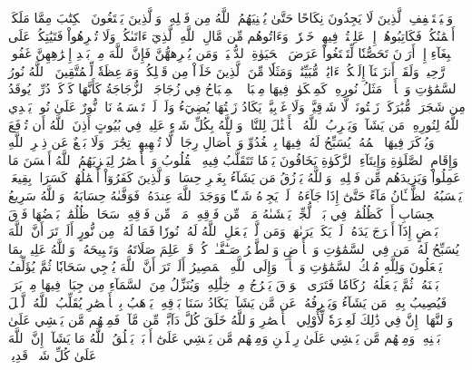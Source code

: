 وَلۡيَسۡتَعۡفِفِ ٱلَّذِينَ لَا يَجِدُونَ نِكَاحًا حَتَّىٰ يُغۡنِيَهُمُ ٱللَّهُ مِن فَضۡلِهِۦۗ وَٱلَّذِينَ يَبۡتَغُونَ ٱلۡكِتَٰبَ مِمَّا مَلَكَتۡ أَيۡمَٰنُكُمۡ فَكَاتِبُوهُمۡ إِنۡ عَلِمۡتُمۡ فِيهِمۡ خَيۡرٗاۖ وَءَاتُوهُم مِّن مَّالِ ٱللَّهِ ٱلَّذِيٓ ءَاتَىٰكُمۡۚ وَلَا تُكۡرِهُواْ فَتَيَٰتِكُمۡ عَلَى ٱلۡبِغَآءِ إِنۡ أَرَدۡنَ تَحَصُّنٗا لِّتَبۡتَغُواْ عَرَضَ ٱلۡحَيَوٰةِ ٱلدُّنۡيَاۚ وَمَن يُكۡرِههُّنَّ فَإِنَّ ٱللَّهَ مِنۢ بَعۡدِ إِكۡرَٰهِهِنَّ غَفُورٞ رَّحِيمٞ
وَلَقَدۡ أَنزَلۡنَآ إِلَيۡكُمۡ ءَايَٰتٖ مُّبَيِّنَٰتٖ وَمَثَلٗا مِّنَ ٱلَّذِينَ خَلَوۡاْ مِن قَبۡلِكُمۡ وَمَوۡعِظَةٗ لِّلۡمُتَّقِينَ
۞ٱللَّهُ نُورُ ٱلسَّمَٰوَٰتِ وَٱلۡأَرۡضِۚ مَثَلُ نُورِهِۦ كَمِشۡكَوٰةٖ فِيهَا مِصۡبَاحٌۖ ٱلۡمِصۡبَاحُ فِي زُجَاجَةٍۖ ٱلزُّجَاجَةُ كَأَنَّهَا كَوۡكَبٞ دُرِّيّٞ يُوقَدُ مِن شَجَرَةٖ مُّبَٰرَكَةٖ زَيۡتُونَةٖ لَّا شَرۡقِيَّةٖ وَلَا غَرۡبِيَّةٖ يَكَادُ زَيۡتُهَا يُضِيٓءُ وَلَوۡ لَمۡ تَمۡسَسۡهُ نَارٞۚ نُّورٌ عَلَىٰ نُورٖۚ يَهۡدِي ٱللَّهُ لِنُورِهِۦ مَن يَشَآءُۚ وَيَضۡرِبُ ٱللَّهُ ٱلۡأَمۡثَٰلَ لِلنَّاسِۗ وَٱللَّهُ بِكُلِّ شَيۡءٍ عَلِيمٞ
فِي بُيُوتٍ أَذِنَ ٱللَّهُ أَن تُرۡفَعَ وَيُذۡكَرَ فِيهَا ٱسۡمُهُۥ يُسَبِّحُ لَهُۥ فِيهَا بِٱلۡغُدُوِّ وَٱلۡأٓصَالِ
رِجَالٞ لَّا تُلۡهِيهِمۡ تِجَٰرَةٞ وَلَا بَيۡعٌ عَن ذِكۡرِ ٱللَّهِ وَإِقَامِ ٱلصَّلَوٰةِ وَإِيتَآءِ ٱلزَّكَوٰةِ يَخَافُونَ يَوۡمٗا تَتَقَلَّبُ فِيهِ ٱلۡقُلُوبُ وَٱلۡأَبۡصَٰرُ
لِيَجۡزِيَهُمُ ٱللَّهُ أَحۡسَنَ مَا عَمِلُواْ وَيَزِيدَهُم مِّن فَضۡلِهِۦۗ وَٱللَّهُ يَرۡزُقُ مَن يَشَآءُ بِغَيۡرِ حِسَابٖ
وَٱلَّذِينَ كَفَرُوٓاْ أَعۡمَٰلُهُمۡ كَسَرَابِۭ بِقِيعَةٖ يَحۡسَبُهُ ٱلظَّمۡـَٔانُ مَآءً حَتَّىٰٓ إِذَا جَآءَهُۥ لَمۡ يَجِدۡهُ شَيۡـٔٗا وَوَجَدَ ٱللَّهَ عِندَهُۥ فَوَفَّىٰهُ حِسَابَهُۥۗ وَٱللَّهُ سَرِيعُ ٱلۡحِسَابِ
أَوۡ كَظُلُمَٰتٖ فِي بَحۡرٖ لُّجِّيّٖ يَغۡشَىٰهُ مَوۡجٞ مِّن فَوۡقِهِۦ مَوۡجٞ مِّن فَوۡقِهِۦ سَحَابٞۚ ظُلُمَٰتُۢ بَعۡضُهَا فَوۡقَ بَعۡضٍ إِذَآ أَخۡرَجَ يَدَهُۥ لَمۡ يَكَدۡ يَرَىٰهَاۗ وَمَن لَّمۡ يَجۡعَلِ ٱللَّهُ لَهُۥ نُورٗا فَمَا لَهُۥ مِن نُّورٍ
أَلَمۡ تَرَ أَنَّ ٱللَّهَ يُسَبِّحُ لَهُۥ مَن فِي ٱلسَّمَٰوَٰتِ وَٱلۡأَرۡضِ وَٱلطَّيۡرُ صَـٰٓفَّـٰتٖۖ كُلّٞ قَدۡ عَلِمَ صَلَاتَهُۥ وَتَسۡبِيحَهُۥۗ وَٱللَّهُ عَلِيمُۢ بِمَا يَفۡعَلُونَ
وَلِلَّهِ مُلۡكُ ٱلسَّمَٰوَٰتِ وَٱلۡأَرۡضِۖ وَإِلَى ٱللَّهِ ٱلۡمَصِيرُ
أَلَمۡ تَرَ أَنَّ ٱللَّهَ يُزۡجِي سَحَابٗا ثُمَّ يُؤَلِّفُ بَيۡنَهُۥ ثُمَّ يَجۡعَلُهُۥ رُكَامٗا فَتَرَى ٱلۡوَدۡقَ يَخۡرُجُ مِنۡ خِلَٰلِهِۦ وَيُنَزِّلُ مِنَ ٱلسَّمَآءِ مِن جِبَالٖ فِيهَا مِنۢ بَرَدٖ فَيُصِيبُ بِهِۦ مَن يَشَآءُ وَيَصۡرِفُهُۥ عَن مَّن يَشَآءُۖ يَكَادُ سَنَا بَرۡقِهِۦ يَذۡهَبُ بِٱلۡأَبۡصَٰرِ
يُقَلِّبُ ٱللَّهُ ٱلَّيۡلَ وَٱلنَّهَارَۚ إِنَّ فِي ذَٰلِكَ لَعِبۡرَةٗ لِّأُوْلِي ٱلۡأَبۡصَٰرِ
وَٱللَّهُ خَلَقَ كُلَّ دَآبَّةٖ مِّن مَّآءٖۖ فَمِنۡهُم مَّن يَمۡشِي عَلَىٰ بَطۡنِهِۦ وَمِنۡهُم مَّن يَمۡشِي عَلَىٰ رِجۡلَيۡنِ وَمِنۡهُم مَّن يَمۡشِي عَلَىٰٓ أَرۡبَعٖۚ يَخۡلُقُ ٱللَّهُ مَا يَشَآءُۚ إِنَّ ٱللَّهَ عَلَىٰ كُلِّ شَيۡءٖ قَدِيرٞ
